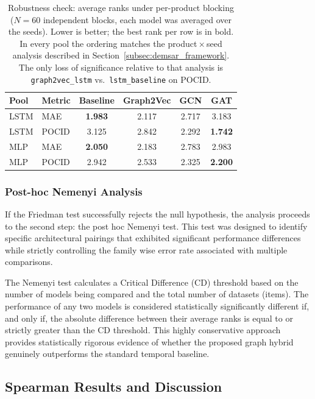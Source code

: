 \begin{table}[ht]
\centering
\caption{Robustness check: average ranks under per-product blocking ($N=60$ independent blocks, each model was averaged over the seeds). Lower is better; the best rank per row is in bold. In every pool the ordering matches the
product\,$\times$\,seed analysis described in Section~\ref{subsec:demsar_framework}. The
only loss of significance relative to that analysis is
\texttt{graph2vec\_lstm} vs.\ \texttt{lstm\_baseline} on POCID.}
\label{tab:perproduct_robustness}
\begin{tabular}{llcccc}
\toprule
Pool & Metric & Baseline & Graph2Vec & GCN & GAT \\
\midrule
LSTM & MAE   & \textbf{1.983} & 2.117 & 2.717 & 3.183 \\
LSTM & POCID & 3.125 & 2.842 & 2.292 & \textbf{1.742} \\
MLP  & MAE   & \textbf{2.050} & 2.183 & 2.783 & 2.983 \\
MLP  & POCID & 2.942 & 2.533 & 2.325 & \textbf{2.200} \\
\bottomrule
\end{tabular}
\end{table}

\subsubsection{Post-hoc Nemenyi Analysis}
\label{subsubsec:posthoc_nemenyi}

If the Friedman test successfully rejects the null hypothesis, the analysis proceeds to the second step: the post hoc Nemenyi test. This test was designed to identify specific architectural pairings that exhibited significant performance differences while strictly controlling the family wise error rate associated with multiple comparisons.

The Nemenyi test calculates a Critical Difference (CD) threshold based on the number of models being compared and the total number of datasets (items). The performance of any two models is considered statistically significantly different if, and only if, the absolute difference between their average ranks is equal to or strictly greater than the CD threshold. This highly conservative approach provides statistically rigorous evidence of whether the proposed graph hybrid genuinely outperforms the standard temporal baseline.
\subsection{Spearman Results and Discussion}
\label{subsec:spearman_results}

